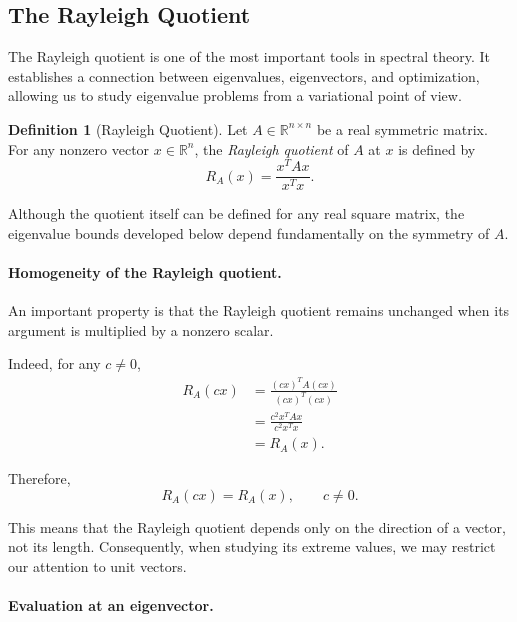 \documentclass[14pt,letterpaper]{article}
\theoremstyle{plain}
\theoremstyle{definition}
\newtheorem{definition}[theorem]{Definition}
\theoremstyle{remark}
\newcommand{\R}{\mathbb{R}}
\begin{document}

\subsection{The Rayleigh Quotient}
\label{subsec:rayleigh_background}

The Rayleigh quotient is one of the most important
tools in spectral theory. It establishes a connection
between eigenvalues, eigenvectors, and optimization,
allowing us to study eigenvalue problems from a
variational point of view.

\begin{definition}[Rayleigh Quotient]
Let $A\in\R^{n\times n}$ be a real symmetric matrix.
For any nonzero vector $x\in\R^n$, the
\emph{Rayleigh quotient} of $A$ at $x$ is defined by
\[
\boxed{
R_A(x)=\frac{x^TAx}{x^Tx}.
}
\]
\end{definition}

Although the quotient itself can be defined for
any real square matrix, the eigenvalue bounds
developed below depend fundamentally on
the symmetry of $A$.

\paragraph{Homogeneity of the Rayleigh quotient.}

An important property is that the Rayleigh
quotient remains unchanged when its argument
is multiplied by a nonzero scalar.

Indeed, for any $c\neq0$,
\[
\begin{aligned}
R_A(cx)
&=\frac{(cx)^TA(cx)}{(cx)^T(cx)}\\[4pt]
&=\frac{c^2x^TAx}{c^2x^Tx}\\[4pt]
&=R_A(x).
\end{aligned}
\]

Therefore,
\[
\boxed{
R_A(cx)=R_A(x),\qquad c\neq0.
}
\]

This means that the Rayleigh quotient depends
only on the direction of a vector, not its
length. Consequently, when studying its
extreme values, we may restrict our attention
to unit vectors.

\paragraph{Evaluation at an eigenvector.}
\end{document}
